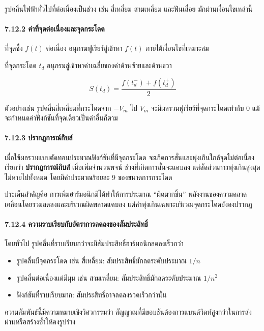 รูปคลื่นไฟฟ้าทั่วไปที่ต่อเนื่องเป็นช่วง เช่น สี่เหลี่ยม สามเหลี่ยม และฟันเลื่อย มักผ่านเงื่อนไขเหล่านี้

\paragraph{7.12.2 ค่าที่จุดต่อเนื่องและจุดกระโดด}

ที่จุดซึ่ง \(f(t)\) ต่อเนื่อง อนุกรมฟูเรียร์ลู่เข้าหา \(f(t)\) ภายใต้เงื่อนไขที่เหมาะสม

ที่จุดกระโดด \(t_d\) อนุกรมลู่เข้าหาค่าเฉลี่ยของค่าด้านซ้ายและด้านขวา

\[
S(t_d)=\frac{f(t_d^-)+f(t_d^+)}{2}
\]

ตัวอย่างเช่น รูปคลื่นสี่เหลี่ยมที่กระโดดจาก \(-V_m\) ไป \(V_m\) จะมีผลรวมฟูเรียร์ที่จุดกระโดดเท่ากับ 0 แม้จะกำหนดค่าฟังก์ชันที่จุดเดียวเป็นค่าอื่นก็ตาม

\paragraph{7.12.3 ปรากฏการณ์กิบส์}

เมื่อใช้ผลรวมแบบตัดทอนประมาณฟังก์ชันที่มีจุดกระโดด จะเกิดการสั่นและพุ่งเกินใกล้จุดไม่ต่อเนื่อง เรียกว่า \textbf{ปรากฏการณ์กิบส์} เมื่อเพิ่มจำนวนพจน์ ช่วงที่เกิดการสั่นจะแคบลง แต่สัดส่วนการพุ่งเกินสูงสุดไม่หายไปทั้งหมด โดยมีค่าประมาณร้อยละ 9 ของขนาดการกระโดด

ประเด็นสำคัญคือ การเพิ่มฮาร์มอนิกมิได้ทำให้การประมาณ ``ผิดมากขึ้น'' พลังงานของความคลาดเคลื่อนโดยรวมลดลงและบริเวณผิดพลาดแคบลง แต่ค่าพุ่งเกินเฉพาะบริเวณจุดกระโดดยังคงปรากฏ

\paragraph{7.12.4 ความราบเรียบกับอัตราการลดลงของสัมประสิทธิ์}

โดยทั่วไป รูปคลื่นที่ราบเรียบกว่าจะมีสัมประสิทธิ์ฮาร์มอนิกลดลงเร็วกว่า

\begin{itemize}
\item
  รูปคลื่นมีจุดกระโดด เช่น สี่เหลี่ยม: สัมประสิทธิ์มักลดระดับประมาณ \(1/n\)
\item
  รูปคลื่นต่อเนื่องแต่มีมุม เช่น สามเหลี่ยม: สัมประสิทธิ์มักลดระดับประมาณ \(1/n^2\)
\item
  ฟังก์ชันที่ราบเรียบมาก: สัมประสิทธิ์อาจลดลงรวดเร็วกว่านั้น
\end{itemize}

ความสัมพันธ์นี้มีความหมายเชิงวิศวกรรมว่า สัญญาณที่มีขอบชันต้องการแบนด์วิดท์สูงกว่าในการส่งผ่านหรือสร้างซ้ำให้คงรูปร่าง

